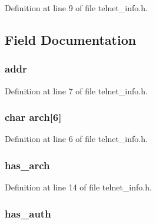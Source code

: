 Definition at line 9 of file telnet\+\_\+info.\+h.



\subsection{Field Documentation}
\subsubsection[{\texorpdfstring{addr}{addr}}]{ addr}\hypertarget{structtelnet__info_a587426ea8fb6d0cbb271fa3abee2219c}{}\label{structtelnet__info_a587426ea8fb6d0cbb271fa3abee2219c}


Definition at line 7 of file telnet\+\_\+info.\+h.

\subsubsection[{\texorpdfstring{arch}{arch}}]{\setlength{\rightskip}{0pt plus 5cm}char arch\mbox{[}6\mbox{]}}\hypertarget{structtelnet__info_a51de8a8ff4eea181532ea93a70052c48}{}\label{structtelnet__info_a51de8a8ff4eea181532ea93a70052c48}


Definition at line 6 of file telnet\+\_\+info.\+h.

\subsubsection[{\texorpdfstring{has\+\_\+arch}{has_arch}}]{ has\+\_\+arch}\hypertarget{structtelnet__info_a22cbf698e4cc8d9469ba39cdd8fd94de}{}\label{structtelnet__info_a22cbf698e4cc8d9469ba39cdd8fd94de}


Definition at line 14 of file telnet\+\_\+info.\+h.

\subsubsection[{\texorpdfstring{has\+\_\+auth}{has_auth}}]{ has\+\_\+auth}\hypertarget{structtelnet__info_ae0863d08adfe65fe9d51053657cfd74c}{}\label{structtelnet__info_ae0863d08adfe65fe9d51053657cfd74c}


